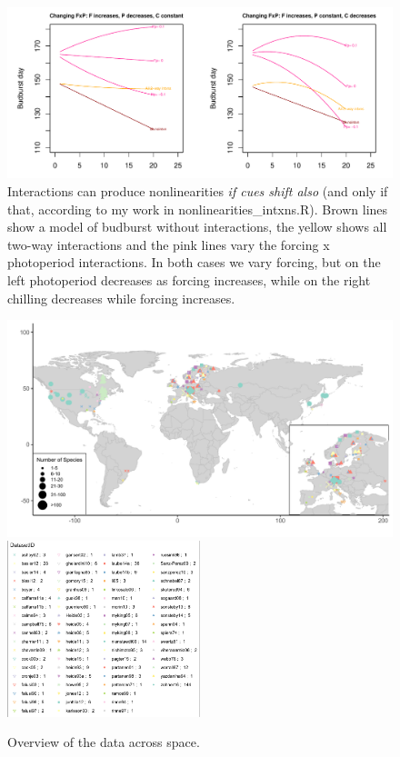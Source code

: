 \documentclass[11pt,letter]{article}
\begin{document}
\begin{figure}[t!]
\centering
\includegraphics[width=1\textwidth]{..//..//analyses/limitingcues/figures/intxnsims_FPexample.pdf}
\caption{Interactions can produce nonlinearities \emph{if cues shift also} (and only if that, according to my work in nonlinearities\_intxns.R). Brown lines show a model of budburst without interactions, the yellow shows all two-way interactions and the pink lines vary the forcing x photoperiod interactions. In both cases we vary forcing, but on the left photoperiod decreases as forcing increases, while on the right chilling decreases while forcing increases.}
  \label{fig:intxns}
\end{figure}
\clearpage



\begin{figure}[t!]
\centering
\includegraphics[width=1\textwidth]{..//..//analyses/limitingcues/figures/maps/map_studyspp.pdf}
\includegraphics[width=0.5\textwidth]{..//..//analyses/limitingcues/figures/maps/map_studyspp_legend.pdf}
\caption{Overview of the data across space.}
  \label{fig:datamap}
\end{figure}
\clearpage
\end{document}
